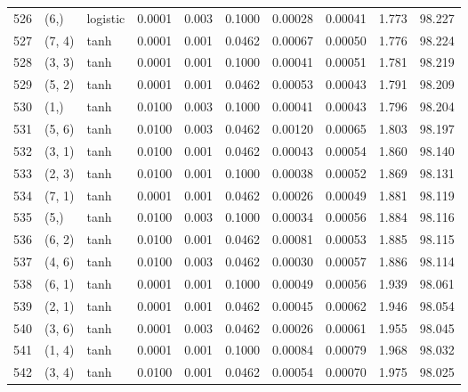 \begin{tabular}{lllrrrrrrr}
526 &        (6,) &  logistic &  0.0001 &  0.003 &  0.1000 &          0.00028 &    0.00041 &       1.773 &    98.227 \\
527 &      (7, 4) &      tanh &  0.0001 &  0.001 &  0.0462 &          0.00067 &    0.00050 &       1.776 &    98.224 \\
528 &      (3, 3) &      tanh &  0.0001 &  0.001 &  0.1000 &          0.00041 &    0.00051 &       1.781 &    98.219 \\
529 &      (5, 2) &      tanh &  0.0001 &  0.001 &  0.0462 &          0.00053 &    0.00043 &       1.791 &    98.209 \\
530 &        (1,) &      tanh &  0.0100 &  0.003 &  0.1000 &          0.00041 &    0.00043 &       1.796 &    98.204 \\
531 &      (5, 6) &      tanh &  0.0100 &  0.003 &  0.0462 &          0.00120 &    0.00065 &       1.803 &    98.197 \\
532 &      (3, 1) &      tanh &  0.0100 &  0.001 &  0.0462 &          0.00043 &    0.00054 &       1.860 &    98.140 \\
533 &      (2, 3) &      tanh &  0.0100 &  0.001 &  0.1000 &          0.00038 &    0.00052 &       1.869 &    98.131 \\
534 &      (7, 1) &      tanh &  0.0001 &  0.001 &  0.0462 &          0.00026 &    0.00049 &       1.881 &    98.119 \\
535 &        (5,) &      tanh &  0.0100 &  0.003 &  0.1000 &          0.00034 &    0.00056 &       1.884 &    98.116 \\
536 &      (6, 2) &      tanh &  0.0100 &  0.001 &  0.0462 &          0.00081 &    0.00053 &       1.885 &    98.115 \\
537 &      (4, 6) &      tanh &  0.0100 &  0.003 &  0.0462 &          0.00030 &    0.00057 &       1.886 &    98.114 \\
538 &      (6, 1) &      tanh &  0.0001 &  0.001 &  0.1000 &          0.00049 &    0.00056 &       1.939 &    98.061 \\
539 &      (2, 1) &      tanh &  0.0001 &  0.001 &  0.0462 &          0.00045 &    0.00062 &       1.946 &    98.054 \\
540 &      (3, 6) &      tanh &  0.0001 &  0.003 &  0.0462 &          0.00026 &    0.00061 &       1.955 &    98.045 \\
541 &      (1, 4) &      tanh &  0.0001 &  0.001 &  0.1000 &          0.00084 &    0.00079 &       1.968 &    98.032 \\
542 &      (3, 4) &      tanh &  0.0100 &  0.001 &  0.0462 &          0.00054 &    0.00070 &       1.975 &    98.025 \\

\end{tabular}
